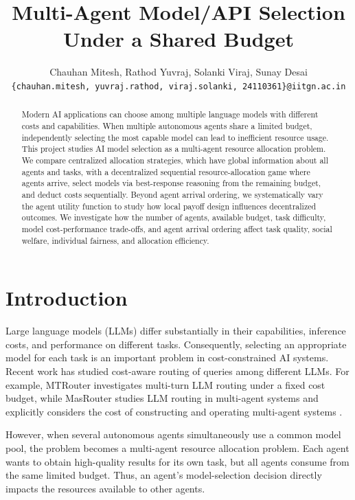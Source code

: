 \documentclass{article}
\title{Multi-Agent Model/API Selection Under a Shared Budget
}
\author{
  Chauhan Mitesh, Rathod Yuvraj, Solanki Viraj, Sunay Desai \\
  \texttt{\{chauhan.mitesh, yuvraj.rathod, viraj.solanki, 24110361\}@iitgn.ac.in} \\
}
\begin{document}
\maketitle

\begin{abstract}
Modern AI applications can choose among multiple language models with different costs and capabilities. When multiple autonomous agents share a limited budget, independently selecting the most capable model can lead to inefficient resource usage. This project studies AI model selection as a multi-agent resource allocation problem. We compare centralized allocation strategies, which have global information about all agents and tasks, with a decentralized sequential resource-allocation game where agents arrive, select models via best-response reasoning from the remaining budget, and deduct costs sequentially. Beyond agent arrival ordering, we systematically vary the agent utility function to study how local payoff design influences decentralized outcomes. We investigate how the number of agents, available budget, task difficulty, model cost-performance trade-offs, and agent arrival ordering affect task quality, social welfare, individual fairness, and allocation efficiency.
\end{abstract}

\section{Introduction}

Large language models (LLMs) differ substantially in their capabilities, inference costs, and performance on different tasks. Consequently, selecting an appropriate model for each task is an important problem in cost-constrained AI systems. Recent work has studied cost-aware routing of queries among different LLMs. For example, MTRouter investigates multi-turn LLM routing under a fixed cost budget, while MasRouter studies LLM routing in multi-agent systems and explicitly considers the cost of constructing and operating multi-agent systems \cite{zhang2026mtrouter,yue2025masrouter}. 

However, when several autonomous agents simultaneously use a common model pool, the problem becomes a multi-agent resource allocation problem. Each agent wants to obtain high-quality results for its own task, but all agents consume from the same limited budget. Thus, an agent's model-selection decision directly impacts the resources available to other agents. 
\end{document}
